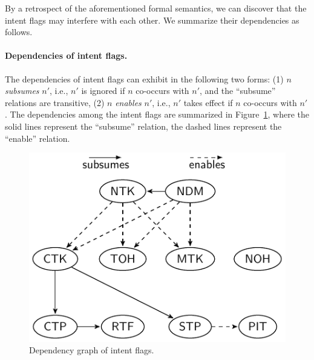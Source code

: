 By a retrospect of the aforementioned formal semantics, we can discover that the intent flags %
may interfere with each other. We summarize their dependencies as follows. 

\paragraph{Dependencies of intent flags.}
The dependencies of intent flags can exhibit in the following two forms: (1) $n$ \emph{subsumes} $n'$, i.e., $n'$ is ignored if $n$ co-occurs with $n'$, and the ``subsume'' relations are transitive, (2) $n$ \emph{enables} $n'$, i.e., $n'$ takes effect if $n$ co-occurs with $n'$. The dependencies among the intent flags are summarized in Figure~\ref{fig-amass-depend}, where the solid lines represent the ``subsume'' relation, the dashed lines represent  the ``enable'' relation.
\begin{figure}[htbp]
        \centering
        \includegraphics[scale = 0.7]{ifo-amass-dependency.pdf}
        \caption{Dependency graph of intent flags.}
    \label{fig-amass-depend}
\end{figure}
\smallskip


